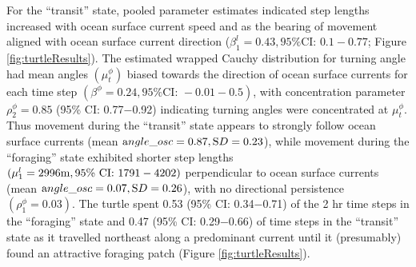 \documentclass[12pt]{article}
\begin{document}
For the ``transit'' state, pooled parameter estimates indicated step lengths increased with ocean surface current speed and as the bearing of movement aligned with ocean surface current direction ($\beta^l_1=0.43, \text{95\% CI: } 0.1-0.77$; Figure \ref{fig:turtleResults}). The estimated wrapped Cauchy distribution for turning angle had mean angles $(\mu^\phi_t)$ biased towards the direction of ocean surface currents for each time step $(\beta^\phi=0.24, \text{95\% CI: } -0.01-0.5)$, with concentration parameter $\rho^\phi_2=0.85$ (95\% CI: 0.77$-$0.92) indicating turning angles were concentrated at $\mu^\phi_t$. Thus movement during the ``transit'' state appears to strongly follow ocean surface currents (mean ${\text angle\_osc}=0.87,{\text SD}=0.23$), while movement during the ``foraging'' state exhibited shorter step lengths $(\mu^l_1=2996{\text m}, \text{95\% CI: } 1791-4202)$ perpendicular to ocean surface currents (mean ${\text angle\_osc}=0.07,{\text SD}=0.26$), with no directional persistence $(\rho^\phi_1=0.03)$. The turtle spent 0.53 (95\% CI: 0.34$-$0.71) of the 2 hr time steps in the ``foraging'' state and 0.47 (95\% CI: 0.29$-$0.66) of time steps in the ``transit'' state as it travelled northeast along a predominant current until it (presumably) found an attractive foraging patch (Figure \ref{fig:turtleResults}).
\end{document}
